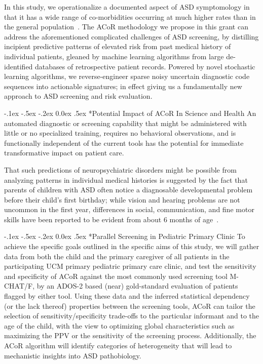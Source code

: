 \documentclass[onecolumn, compsoc,11pt]{IEEEtran}
\makeatletter
\renewcommand\paragraph{\@startsection {section}{1}{\z@}%
                                   {-.1ex \@plus -.5ex \@minus -.2ex}%
                                   {0.0ex \@plus.5ex}%
                                   {\fontsize{11}{10}\selectfont\bfseries\itshape\sffamily\color{black}}}
\def\ZERO{ACoR\xspace}
\makeatother
\begin{document}
In this study, we operationalize a documented aspect of ASD symptomology in  that it has   a wide range  of co-morbidities occurring at much higher rates than in the general population~\cite{hyman2020identification}.
The \ZERO methodology we propose in this grant can address the aforementioned  complicated  challenges of ASD screening, by distilling incipient predictive patterns of  elevated risk from past medical history of individual  patients, gleaned by machine learning  algorithms from large  de-identified databases of retrospective patient records. Powered by  novel stochastic learning algorithms, we  reverse-engineer sparse noisy uncertain diagnostic code sequences into actionable signatures; in effect giving us  a fundamentally new approach to ASD screening and risk evaluation.

\paragraph*{Potential  Impact  of  \ZERO In Science and Health}
An automated   diagnostic or screening capability that might be administered with little or no specialized training, requires no behavioral observations, and is functionally independent of the current tools  has the potential for  immediate transformative  impact on patient care. 

That such  predictions  of neuropsychiatric  disorders might be possible  from analyzing patterns in individual medical histories   is suggested by the fact  that  parents of children with ASD often notice a diagnosable developmental problem before their child's first birthday; while vision and hearing problems are not uncommon in the first year,  differences in social, communication, and fine motor skills have been reported to be  evident from about 6 months of age~\cite{pmid21410398,herlihy2015parents,chawarska2013decreased}. 

\paragraph*{Parallel Screening in Pediatric Primary Clinic} To achieve the specific goals outlined in the specific aims of this study, we will gather data from both the child and the primary caregiver of all patients in the participating UCM primary pediatric primary care clinic, and test the sensitivity and specificity of \ZERO against the most commonly used screening tool M-CHAT/F, by an ADOS-2 based  (near) gold-standard evaluation of   patients flagged by either tool. Using these data and the inferred statistical dependency (or the lack thereof) properties between the screening tools, \ZERO  can tailor the selection of sensitivity/specificity trade-offs  to the particular informant and to the age of the child, with the view to optimizing global characteristics such as maximizing the PPV or the sensitivity of the screening process. Additionally, the \ZERO algorithm will identify categories of heterogeneity that will lead to mechanistic insights into ASD pathobiology.
\end{document}
